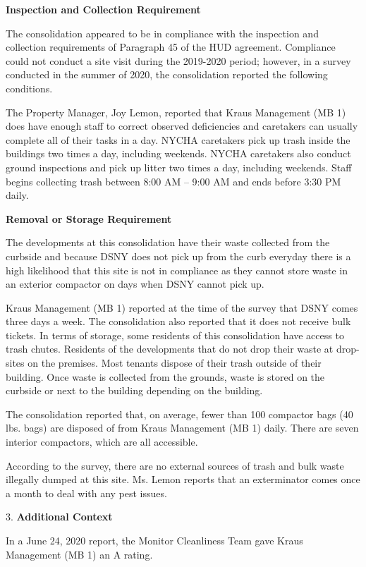 

\textbf{Inspection and Collection Requirement}

The consolidation appeared to be in compliance with the inspection and collection requirements of Paragraph 45 of the HUD agreement. Compliance could not conduct a site visit during the 2019-2020 period; however, in a survey conducted in the summer of 2020, the consolidation reported the following conditions.

The Property Manager, Joy Lemon, reported that Kraus Management (MB 1) does have enough staff to correct observed deficiencies and caretakers can usually complete all of their tasks in a day. NYCHA caretakers pick up trash inside the buildings two times a day, including weekends. NYCHA caretakers also conduct ground inspections and pick up litter two times a day, including weekends. Staff begins collecting trash between 8:00 AM -- 9:00 AM and ends before 3:30 PM daily. 

\textbf{Removal or Storage Requirement}

The developments at this consolidation have their waste collected from the curbside and because DSNY does not pick up from the curb everyday there is a high likelihood that this site is not in compliance as they cannot store waste in an exterior compactor on days when DSNY cannot pick up. 

Kraus Management (MB 1) reported at the time of the survey that DSNY comes three days a week. The consolidation also reported that it does not receive bulk tickets. In terms of storage, some residents of this consolidation have access to trash chutes. Residents of the developments that do not drop their waste at drop-sites on the premises. Most tenants dispose of their trash outside of their building. Once waste is collected from the grounds, waste is stored on the curbside or next to the building depending on the building. 

The consolidation reported that, on average, fewer than 100 compactor bags (40 lbs. bags) are disposed of from Kraus Management (MB 1) daily. There are seven interior compactors, which are all accessible. 

According to the survey, there are no external sources of trash and bulk waste illegally dumped at this site. Ms. Lemon reports that an exterminator comes once a month to deal with any pest issues. 

3. \textbf{Additional Context} 

In a June 24, 2020 report, the Monitor Cleanliness Team gave Kraus Management (MB 1)  an A rating. 